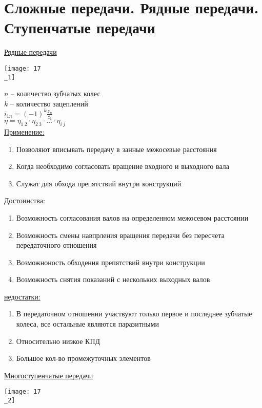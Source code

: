 \documentclass{article}
\begin{document}
\section{Сложные передачи. Рядные передачи. Ступенчатые передачи}

\underline{Рядные передачи}

\texttt{[image: 17\\\_1]}

$n$ -- количество зубчатых колес\\
$k$ -- количество зацеплений\\
$i_{1n} = (-1)^k \frac{z_n}{z_1}$\\
$\eta = \eta_{1\:2}\cdot\eta_{2\:3}\cdot\dots\cdot\eta_{i\:j}$\\
\underline{Применение:}
\begin{enumerate}
	\item Позволяют вписывать передачу в занные межосевые расстояния
	\item Когда необходимо согласовать вращение входного и выходного вала
	\item Служат для обхода препятствий внутри конструкций
\end{enumerate}
\underline{Достоинства:} 
\begin{enumerate}
	\item Возможность согласования валов на определенном межосевом расстоянии
	\item Возможность смены навпрления вращения передачи без пересчета передаточного отношения
	\item Возможноность обходения препятствий внутри конструкции
	\item Возможность снятия показаний с нескольких выходных валов
\end{enumerate}
\underline{недостатки:} 
\begin{enumerate}
	\item В передаточном отношении участвуют только первое и последнее зубчатые колеса, все остальные являются паразитными
	\item Относительно низкое КПД
	\item Большое кол-во промежуточных элементов
\end{enumerate}

\underline{Многоступенчатые передачи} 

\texttt{[image: 17\\\_2]}
\end{document}
